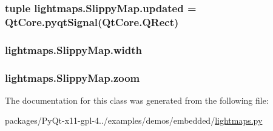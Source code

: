 \subsubsection[{updated}]{\setlength{\rightskip}{0pt plus 5cm}tuple lightmaps.\+Slippy\+Map.\+updated = Qt\+Core.\+pyqt\+Signal(Qt\+Core.\+Q\+Rect)\hspace{0.3cm}{\ttfamily [static]}}\label{classlightmaps_1_1SlippyMap_a8bbb4bd4d0ffdb47d8adcb9b931c7532}
\hypertarget{classlightmaps_1_1SlippyMap_aa59c387b9168336e818c7649f4796edd}{}
\subsubsection[{width}]{\setlength{\rightskip}{0pt plus 5cm}lightmaps.\+Slippy\+Map.\+width}\label{classlightmaps_1_1SlippyMap_aa59c387b9168336e818c7649f4796edd}
\hypertarget{classlightmaps_1_1SlippyMap_a48e6c1ba2e7bd1fe16f6e10c72e241dc}{}
\subsubsection[{zoom}]{\setlength{\rightskip}{0pt plus 5cm}lightmaps.\+Slippy\+Map.\+zoom}\label{classlightmaps_1_1SlippyMap_a48e6c1ba2e7bd1fe16f6e10c72e241dc}


The documentation for this class was generated from the following file\+:\begin{DoxyCompactItemize}
\item 
packages/\+Py\+Qt-\/x11-\/gpl-\/4../examples/demos/embedded/\hyperlink{lightmaps_8py}{lightmaps.\+py}\end{DoxyCompactItemize}

